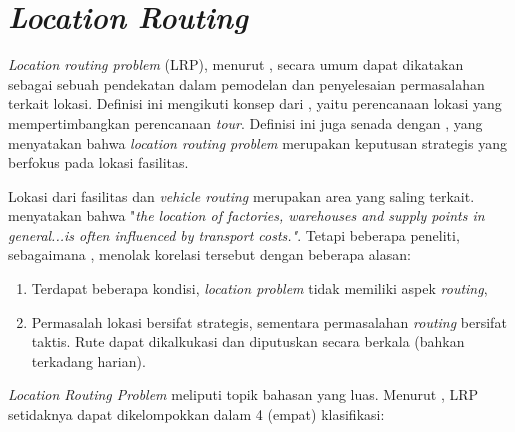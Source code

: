 \section{\textit{Location Routing}}
\label{sec:location-routing}
\textit{Location routing problem} (LRP), menurut \citep{nagy_location-routing:_2007}, secara umum dapat dikatakan sebagai sebuah pendekatan dalam pemodelan dan penyelesaian permasalahan terkait lokasi. Definisi ini mengikuti konsep dari \citep{bruns_zweistufige_1998}, yaitu perencanaan lokasi yang mempertimbangkan perencanaan \textit{tour}. Definisi ini juga senada dengan \citep{balakrishnan_integrated_1987}, yang menyatakan bahwa \textit{location routing problem} merupakan keputusan strategis yang berfokus pada lokasi fasilitas.


Lokasi dari fasilitas dan \textit{vehicle routing} merupakan area yang saling terkait. \citep{maranzana_location_1964} menyatakan bahwa "\textit{the location of factories, warehouses and supply points in general...is often influenced by transport costs."}. Tetapi beberapa peneliti, sebagaimana \citep{nagy_location-routing:_2007}, menolak korelasi tersebut dengan beberapa alasan:

\begin{enumerate}
\item Terdapat beberapa kondisi, \textit{location problem} tidak memiliki aspek \textit{routing}, 
\item Permasalah lokasi bersifat strategis, sementara permasalahan \textit{routing} bersifat taktis. Rute dapat dikalkukasi dan diputuskan secara berkala (bahkan terkadang harian).
\end{enumerate}


\textit{Location Routing Problem} meliputi topik bahasan yang luas. Menurut \citep{nagy_location-routing:_2007}, LRP setidaknya dapat dikelompokkan dalam 4 (empat) klasifikasi:

